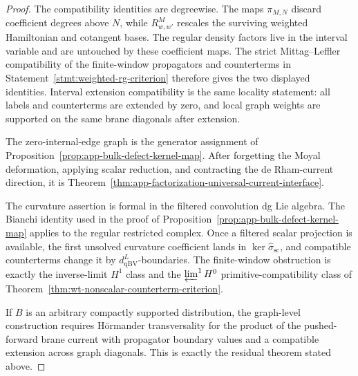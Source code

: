 \begin{proof}
  The compatibility identities are degreewise.  The maps \(\pi_{M,N}\)
  discard coefficient degrees above \(N\), while \(R^M_{w,w'}\) rescales
  the surviving weighted Hamiltonian and cotangent bases.  The regular
  density factors live in the interval variable and are untouched by these
  coefficient maps.  The strict Mittag--Leffler compatibility of the
  finite-window propagators and counterterms in
  Statement~\ref{stmt:weighted-rg-criterion} therefore gives the two
  displayed identities.  Interval extension compatibility is the same
  locality statement: all labels and counterterms are extended by zero, and
  local graph weights are supported on the same brane diagonals after
  extension.

  The zero-internal-edge graph is the generator assignment of
  Proposition~\ref{prop:app-bulk-defect-kernel-map}.  After forgetting
  the Moyal deformation, applying scalar reduction, and contracting the
  de Rham-current direction, it is
  Theorem~\ref{thm:app-factorization-universal-current-interface}.

  The curvature assertion is formal in the filtered convolution dg Lie
  algebra.  The Bianchi identity used in the proof of
  Proposition~\ref{prop:app-bulk-defect-kernel-map} applies to the
  regular restricted complex.  Once a filtered scalar projection is
  available, the first unsolved curvature coefficient lands in
  \(\ker\widehat\sigma_{\mathrm{sc}}\), and compatible counterterms change
  it by \(d_{\mathrm{qBV}}^L\)-boundaries.  The finite-window obstruction is
  exactly the inverse-limit \(H^1\) class and the
  \(\varprojlim^1H^0\) primitive-compatibility class of
  Theorem~\ref{thm:wt-nonscalar-counterterm-criterion}.

	  If \(B\) is an arbitrary compactly supported distribution, the
	  graph-level construction requires H\"ormander transversality for the
	  product of the pushed-forward brane current with propagator boundary
	  values and a compatible extension across graph diagonals.  This is
	  exactly the residual theorem stated above.
\end{proof}

